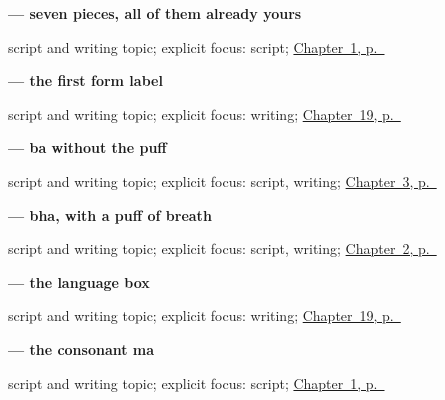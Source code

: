 \noindent\begin{minipage}[t]{\linewidth}
\raggedright
\textbf{ — seven pieces, all of them already yours}\par
\footnotesize script and writing topic; explicit focus: script; \hyperref[ch:first-greeting-script]{Chapter~1, p.~\pageref*{ch:first-greeting-script}}
\end{minipage}\par\smallskip

\noindent\begin{minipage}[t]{\linewidth}
\raggedright
\textbf{ — the first form label}\par
\footnotesize script and writing topic; explicit focus: writing; \hyperref[ch:mr-a1-form-labels]{Chapter~19, p.~\pageref*{ch:mr-a1-form-labels}}
\end{minipage}\par\smallskip

\noindent\begin{minipage}[t]{\linewidth}
\raggedright
\textbf{ — ba without the puff}\par
\footnotesize script and writing topic; explicit focus: script, writing; \hyperref[ch:thanks-script-b]{Chapter~3, p.~\pageref*{ch:thanks-script-b}}
\end{minipage}\par\smallskip

\noindent\begin{minipage}[t]{\linewidth}
\raggedright
\textbf{ — bha, with a puff of breath}\par
\footnotesize script and writing topic; explicit focus: script, writing; \hyperref[ch:thanks-script-a]{Chapter~2, p.~\pageref*{ch:thanks-script-a}}
\end{minipage}\par\smallskip

\noindent\begin{minipage}[t]{\linewidth}
\raggedright
\textbf{ — the language box}\par
\footnotesize script and writing topic; explicit focus: writing; \hyperref[ch:mr-a1-form-labels]{Chapter~19, p.~\pageref*{ch:mr-a1-form-labels}}
\end{minipage}\par\smallskip

\noindent\begin{minipage}[t]{\linewidth}
\raggedright
\textbf{ — the consonant ma}\par
\footnotesize script and writing topic; explicit focus: script; \hyperref[ch:first-greeting-script]{Chapter~1, p.~\pageref*{ch:first-greeting-script}}
\end{minipage}\par\smallskip

